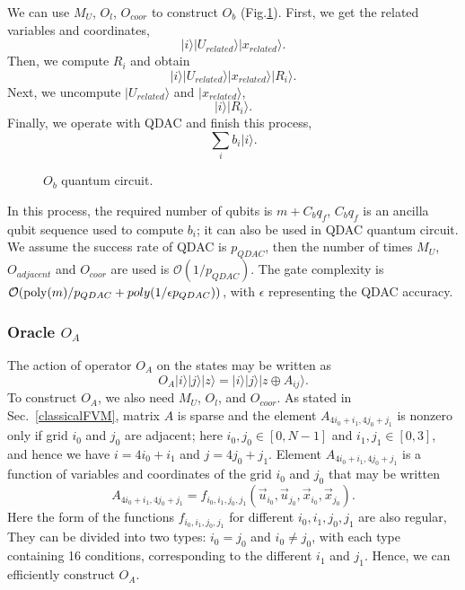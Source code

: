 \documentclass[%
 reprint,
 amsmath,amssymb,
pra,
]{revtex4-1}
\begin{document}
We can use $M_U$, $O_l$, $O_{coor}$ to construct $O_b$ (Fig.\ref{fig:OB}). First, we get the related variables and coordinates,
\begin{equation}
|i\rangle|U_{related}\rangle|x_{related}\rangle.
\end{equation}
Then, we compute $R_i$ and obtain
\begin{equation}
|i\rangle|U_{related}\rangle|x_{related}\rangle|R_i\rangle.
\end{equation}
Next, we uncompute $|U_{related}\rangle$ and $|x_{related}\rangle$,
\begin{equation}
|i\rangle|R_i\rangle.
\end{equation}
Finally, we operate with QDAC and finish this process,
\begin{equation}
\sum_i{b_i|i\rangle}.
\end{equation}

\begin{figure}[htbp]
    \caption{$O_b$ quantum circuit. }
    \label{fig:OB}
\end{figure}

In this process, the required number of qubits is $m+C_bq_f$, $C_bq_f$ is an ancilla qubit sequence used to compute $b_i$; it can also be used in QDAC quantum circuit. We assume the success rate of QDAC is $p_{QDAC}$, then the number of times $M_U$, $O_{adjacent}$ and $O_{coor}$ are used is $\mathcal{O}(1/p_{QDAC})$. The gate complexity is $\mathcal{O}({\rm poly}(m)/p_{QDAC}+poly(1/\epsilon p_{QDAC}))$, with $\epsilon$ representing the QDAC accuracy.

\subsubsection{Oracle $O_A$}
The action of operator $O_A$ on the states may be written as
\begin{equation}
O_A|i\rangle|j\rangle|z\rangle=|i\rangle|j\rangle|z\oplus A_{ij}\rangle.
\end{equation}
To construct $O_A$, we also need $M_U$, $O_l$, and $O_{coor}$. As stated in Sec.~\ref{classicalFVM}, matrix $A$ is sparse and the element $A_{4i_0+i_1,4j_0+j_1} $ is nonzero only if grid $i_0$ and $j_0$ are adjacent; here $i_0,j_0\in[0,N-1]$ and $i_1,j_1\in[0,3]$, and hence we have $i=4i_0+i_1$ and $j=4j_0+j_1$. Element $A_{4i_0+i_1,4j_0+j_1}$ is a function of variables and coordinates of the grid $i_0$ and $j_0$ that may be written
\begin{equation}
A_{4i_0+i_1,4j_0+j_1}=f_{i_0,i_1,j_0,j_1}
(\vec{u}_{i_0},\vec{u}_{j_0},\vec{x}_{i_0},\vec{x}_{j_0}).
\end{equation}
Here the form of the functions $f_{i_0,i_1,j_0,j_1}$ for different $i_0,i_1,j_0,j_1$ are also regular, They can be divided into two types: $i_0=j_0$ and $i_0\neq j_0$, with each type containing 16 conditions, corresponding to the different $i_1$ and $j_1$. Hence, we can efficiently construct $O_A$.
\end{document}

